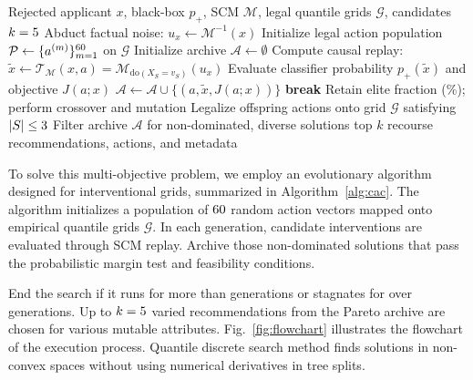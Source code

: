 \documentclass[nolineno]{paper/ieee-access/ieeeaccess}%
\newcommand{\CAC}{CAC}
\newcommand{\SCM}{\ensuremath{\mathcal{M}}}
\newcommand{\Replay}{\ensuremath{\mathcal{T}_{\SCM}}}
\begin{document}
\begin{algorithm}[t]
\caption{Evolutionary Causal Action Search (\CAC{})}
\label{alg:cac}
\begin{algorithmic}[1]
\Require Rejected applicant $x$, black-box $p_+$, SCM $\SCM$, legal quantile grids $\mathcal{G}$, candidates $k=5$
\State Abduct factual noise: $u_x \leftarrow \SCM^{-1}(x)$
\State Initialize legal action population $\mathcal{P} \leftarrow \{a^{(m)}\}_{m=1}^{60}$ on $\mathcal{G}$
\State Initialize archive $\mathcal{A} \leftarrow \emptyset$
    \State Compute causal replay: $\widetilde{x} \leftarrow \Replay(x, a) = \SCM_{\mathrm{do}(X_S=v_S)}(u_x)$
    \State Evaluate classifier probability $p_+(\widetilde{x})$ and objective $J(a; x)$
      \State $\mathcal{A} \leftarrow \mathcal{A} \cup \{(a, \widetilde{x}, J(a; x))\}$
    \EndIf
  \EndFor
    \State \textbf{break}
  \EndIf
  \State Retain elite fraction (\ElitePercent\%); perform crossover and mutation
  \State Legalize offspring actions onto grid $\mathcal{G}$ satisfying $|S| \le 3$
\EndFor
  \State Filter archive $\mathcal{A}$ for non-dominated, diverse solutions
\State \Return top $k$ recourse recommendations, actions, and metadata
\end{algorithmic}
\end{algorithm}

To solve this multi-objective problem, we employ an evolutionary algorithm designed for interventional grids, summarized in Algorithm~\ref{alg:cac}. The algorithm initializes a population of $60$ random action vectors mapped onto empirical quantile grids $\mathcal{G}$. In each generation, candidate interventions are evaluated through SCM replay. Archive those non-dominated solutions that pass the probabilistic margin test and feasibility conditions.

End the search if it runs for more than \MaxGenerations{} generations or stagnates for over \SearchPatience{} generations. Up to $k=5$ varied recommendations from the Pareto archive are chosen for various mutable attributes. Fig.~\ref{fig:flowchart} illustrates the flowchart of the execution process. Quantile discrete search method finds solutions in non-convex spaces without using numerical derivatives in tree splits.
\end{document}
